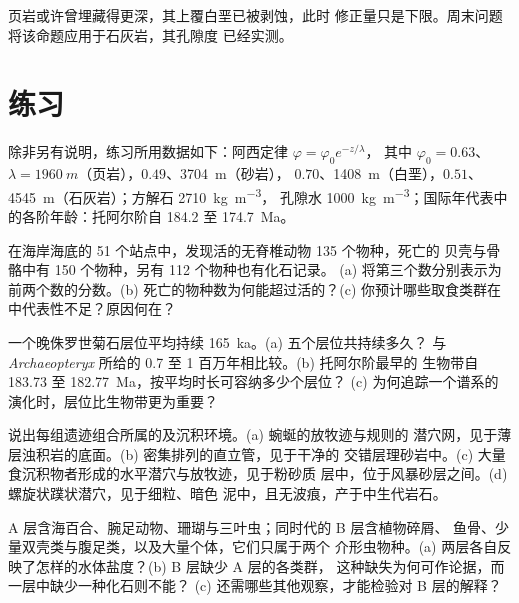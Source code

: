 页岩或许曾埋藏得更深，其上覆白垩已被剥蚀，此时
修正量只是下限。周末问题将该命题应用于石灰岩，其孔隙度
已经实测。

\section*{练习}\label{sec:b2:palaeoenvironments:exercises}

除非另有说明，练习所用数据如下：阿西定律 $\varphi = \varphi_0 e^{-z/\lambda}$，
其中 $\varphi_0 = 0.63$、$\lambda = \qty{1960}{m}$（页岩），$0.49$、\qty{3704}{m}（砂岩），
$0.70$、\qty{1408}{m}（白垩），$0.51$、\qty{4545}{m}（石灰岩）；方解石 \qty{2710}{kg.m^{-3}}，
孔隙水 \qty{1000}{kg.m^{-3}}；国际年代表中的各阶年龄：托阿尔阶自 184.2 至
\qty{174.7}{Ma}。

\begin{exercise}[$\star$]\label{exo:b2:palaeoenvironments:1}
在海岸海底的 51 个站点中，发现活的无脊椎动物 135 个物种，死亡的
贝壳与骨骼中有 150 个物种，另有 112 个物种也有化石记录。
(a) 将第三个数分别表示为前两个数的分数。(b) 死亡的物种数为何能超过活的？(c)
你预计哪些取食类群在中代表性不足？原因何在？
\end{exercise}

\begin{exercise}[$\star$]\label{exo:b2:palaeoenvironments:2}
一个晚侏罗世菊石层位平均持续 \qty{165}{ka}。(a) 五个层位共持续多久？
与 \emph{Archaeopteryx} 所给的 0.7 至 1 百万年相比较。(b) 托阿尔阶最早的
生物带自 183.73 至 \qty{182.77}{Ma}，按平均时长可容纳多少个层位？
(c) 为何追踪一个谱系的演化时，层位比生物带更为重要？
\end{exercise}

\begin{exercise}[$\star$]\label{exo:b2:palaeoenvironments:3}
说出每组遗迹组合所属的及沉积环境。(a) 蜿蜒的放牧迹与规则的
潜穴网，见于薄层浊积岩的底面。(b) 密集排列的直立管，见于干净的
交错层理砂岩中。(c) 大量食沉积物者形成的水平潜穴与放牧迹，见于粉砂质
层中，位于风暴砂层之间。(d) 螺旋状蹼状潜穴，见于细粒、暗色
泥中，且无波痕，产于中生代岩石。
\end{exercise}

\begin{exercise}[$\star$]\label{exo:b2:palaeoenvironments:4}
A 层含海百合、腕足动物、珊瑚与三叶虫；同时代的 B 层含植物碎屑、
鱼骨、少量双壳类与腹足类，以及大量个体，它们只属于两个
介形虫物种。(a) 两层各自反映了怎样的水体盐度？(b) B 层缺少 A 层的各类群，
这种缺失为何可作论据，而一层中缺少一种化石则不能？
(c) 还需哪些其他观察，才能检验对 B 层的解释？
\end{exercise}

